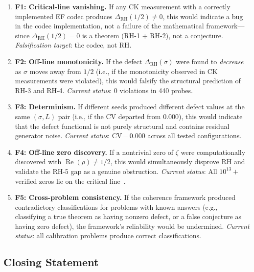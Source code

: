 \documentclass[11pt]{article}
\theoremstyle{remark}
\DeclareMathOperator{\Rea}{Re}
\begin{document}
\begin{enumerate}
  \item \textbf{F1: Critical-line vanishing.}
    If any CK measurement with a correctly implemented EF codec produces
    $\Delta_{\mathrm{RH}}(1/2)\neq 0$, this would indicate a bug in the
    codec implementation, not a failure of the mathematical framework---since
    $\Delta_{\mathrm{RH}}(1/2)=0$ is a theorem (RH-1 + RH-2), not a conjecture.
    \emph{Falsification target}: the codec, not RH.

  \item \textbf{F2: Off-line monotonicity.}
    If the defect $\Delta_{\mathrm{RH}}(\sigma)$ were found to \emph{decrease}
    as $\sigma$ moves away from $1/2$ (i.e., if the monotonicity observed in
    CK measurements were violated), this would falsify the structural prediction
    of RH-3 and RH-4.
    \emph{Current status}: 0 violations in 440 probes.

  \item \textbf{F3: Determinism.}
    If different seeds produced different defect values at the same $(\sigma,L)$
    pair (i.e., if the CV departed from 0.000), this would indicate that the
    defect functional is not purely structural and contains residual generator
    noise.
    \emph{Current status}: CV\,=\,0.000 across all tested configurations.

  \item \textbf{F4: Off-line zero discovery.}
    If a nontrivial zero of $\zeta$ were computationally discovered with
    $\Rea(\rho)\neq 1/2$, this would simultaneously disprove RH and validate
    the RH-5 gap as a genuine obstruction.
    \emph{Current status}: All $10^{13}+$ verified zeros lie on the critical
    line~\cite{Odl}.

  \item \textbf{F5: Cross-problem consistency.}
    If the coherence framework produced contradictory classifications for
    problems with known answers (e.g., classifying a true theorem as having
    nonzero defect, or a false conjecture as having zero defect), the
    framework's reliability would be undermined.
    \emph{Current status}: all calibration problems produce correct classifications.
\end{enumerate}

\subsection{Closing Statement}
\end{document}
